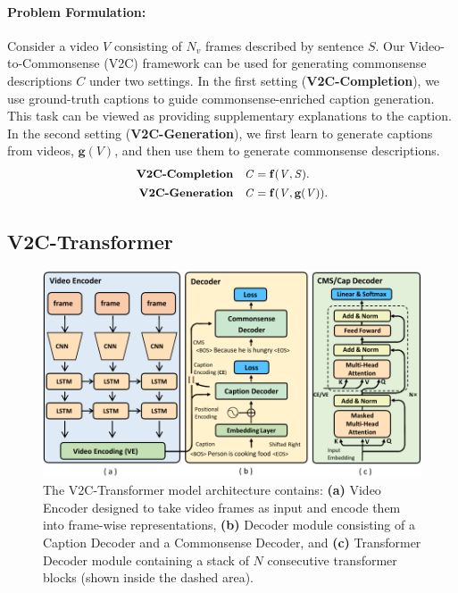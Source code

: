 \paragraph{Problem Formulation:} 
Consider a video $\mathit{V}$ consisting of $N_v$ frames described by sentence $\mathit{S}$. 
Our Video-to-Commonsense (V2C) framework can be used for generating commonsense descriptions $\mathit{C}$ under two settings.
In the first setting (\textbf{V2C-Completion}), we use ground-truth captions to guide commonsense-enriched caption generation.
This task can be viewed as providing supplementary explanations to the caption.
In the second setting (\textbf{V2C-Generation}), we first learn to generate captions from videos, $\mathbf{g}(\mathit{V})$, and then use them to generate commonsense descriptions.
\begin{align}
    \small
    \begin{split}
        \textbf{V2C-Completion}  \quad \mathit{C} &= \mathbf{f}(\mathit{V}, \mathit{S}).\\
        \small
        \textbf{V2C-Generation}  \quad \mathit{C} &= \mathbf{f}(\mathit{V}, \mathbf{g}(\mathit{V})).
    \end{split}
\end{align}

    \subsection{V2C-Transformer}
    \begin{figure}[t]
        \centering
        \includegraphics[width=.9\textwidth]{./v2c/fig/architecture.pdf}
        \caption{
        The V2C-Transformer model architecture contains:
        \textbf{(a)} Video Encoder designed to take video frames as input and encode them into frame-wise representations, 
        \textbf{(b)} Decoder module consisting of a Caption Decoder and a Commonsense Decoder, and
        \textbf{(c)} Transformer Decoder module containing a stack of $N$ consecutive transformer blocks (shown inside the dashed area).
        }
        \label{fig:architecture}
    \end{figure}
    
